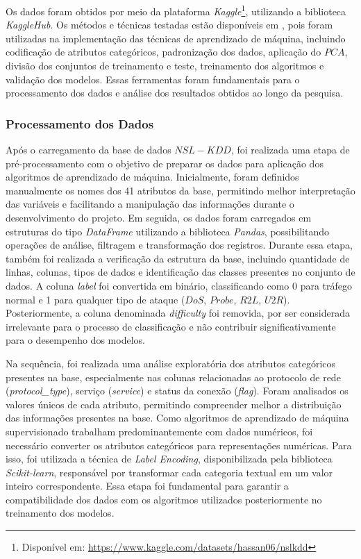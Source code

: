 \documentclass[a4paper,10pt, twocolumn]{article}
\begin{document}
Os dados foram obtidos por meio da plataforma \textit{Kaggle}\footnote{Disponível em: \url{https://www.kaggle.com/datasets/hassan06/nslkdd}}, utilizando a biblioteca 
\textit{KaggleHub}. Os métodos e técnicas testadas estão disponíveis em \cite{scikit2026learn}, pois foram utilizadas na implementação 
das técnicas de aprendizado de máquina, incluindo codificação de atributos categóricos, 
padronização dos dados, aplicação do $PCA$, divisão dos conjuntos de treinamento e 
teste, treinamento dos algoritmos e validação dos modelos. Essas ferramentas foram 
fundamentais para o processamento dos dados e análise dos resultados obtidos ao 
longo da pesquisa.

\subsubsection{Processamento dos Dados}
Após o carregamento da base de dados $NSL-KDD$, foi realizada uma etapa de 
pré-processamento com o objetivo de preparar os dados para aplicação dos 
algoritmos de aprendizado de máquina. Inicialmente, foram definidos manualmente 
os nomes dos 41 atributos da base, permitindo melhor interpretação das variáveis 
e facilitando a manipulação das informações durante o desenvolvimento do projeto. 
Em seguida, os dados foram carregados em estruturas do tipo \textit{DataFrame} utilizando 
a biblioteca \textit{Pandas}, possibilitando operações de análise, filtragem e 
transformação dos registros. Durante essa etapa, também foi realizada a 
verificação da estrutura da base, incluindo quantidade de linhas, colunas, 
tipos de dados e identificação das classes presentes no conjunto de dados. A 
coluna \textit{label} foi convertida em binário, classificando como 0 para tráfego normal 
e 1 para qualquer tipo de ataque ($DoS$, $Probe$, $R2L$, $U2R$). Posteriormente, a 
coluna denominada \textit{difficulty} foi removida, por ser considerada irrelevante para 
o processo de classificação e não contribuir significativamente para o desempenho 
dos modelos.


Na sequência, foi realizada uma análise exploratória dos atributos categóricos 
presentes na base, especialmente nas colunas relacionadas ao protocolo de rede 
(\textit{protocol\_type}), serviço (\textit{service}) e status da conexão (\textit{flag}). Foram analisados 
os valores únicos de cada atributo, permitindo compreender melhor a distribuição 
das informações presentes na base. Como algoritmos de aprendizado de máquina 
supervisionado trabalham predominantemente com dados numéricos, foi necessário 
converter os atributos categóricos para representações numéricas. Para isso, foi 
utilizada a técnica de \textit{Label Encoding}, disponibilizada pela biblioteca \textit{Scikit-learn}, 
responsável por transformar cada categoria textual em um valor inteiro 
correspondente. Essa etapa foi fundamental para garantir a compatibilidade dos 
dados com os algoritmos utilizados posteriormente no treinamento dos modelos.
\end{document}
